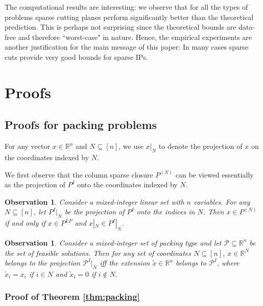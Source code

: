\documentclass[smallextended]{svjour3}
\newtheorem{observation}[proposition]{Observation}
\begin{document}
The computational results are interesting: we observe that for all the types of problems sparse cutting planes perform significantly better than the theoretical prediction. This is perhaps not surprising since the theoretical bounds are data-free and therefore ``worst-case" in nature. Hence, the empirical experiments are another justification for the main message of this paper: In many cases sparse cuts provide very good bounds for sparse IPs.

\section{Proofs}\label{sec:proofs}
\subsection{Proofs for packing problems}\label{sec:proofpacking}

For any vector $x \in \mathbb{R}^n$ and $N \subseteq [n]$, we use $x|_N$ to denote the projection of $x$ on the coordinates indexed by $N$. 

	We first observe that the column sparse closure $P^{(N)}$ can be viewed essentially as the projection of $P^I$ onto the coordinates indexed by $N$.

\begin{observation}\label{prop:fund}
Consider a mixed-integer linear set with $n$ variables. For any $N \subseteq [n]$, let $P^I|_N$ be the projection of $P^I$ onto the indices in $N$. 
Then $x \in P^{(N)}$ if and only if $x \in P^{LP}$ and $x|_N \in P^I|_N$.
\end{observation}

\begin{observation}\label{obs:projPack}
		Consider a mixed-integer set of packing type and let $\mathcal{P} \subseteq {\mathbb{R}}^n$ be the set of feasible solutions. Then for any set of coordinates $N \subseteq [n]$, $x \in {\mathbb{R}}^N$ belongs to the projection $\mathcal{P}^I|_N$ iff the extension $\tilde{x} \in {\mathbb{R}}^n$ belongs to $\mathcal{P}^I$, where $\tilde{x}_i = x_i$ if $i \in N$ and $\tilde{x}_i = 0$ if $i \notin N$.

\end{observation}

	

\subsubsection{Proof of Theorem \ref{thm:packing}} \label{sec:packingMain}
\end{document}
